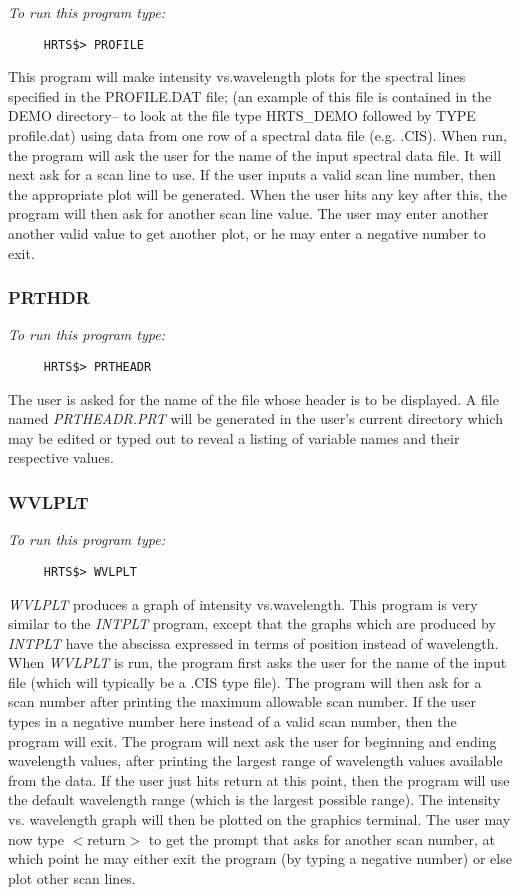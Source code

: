 {\em To run this program type:}
\begin{verbatim}                
     HRTS$> PROFILE               
\end{verbatim}
  This program will make intensity vs.wavelength plots for the
  spectral lines specified in the  PROFILE.DAT file; (an example of 
  this file is contained in the DEMO directory-- to look at the file type 
  HRTS\_DEMO followed by TYPE profile.dat)
  using data from one row of a spectral data file (e.g. .CIS).  When
  run, the program will ask the user for the name of the input spectral
  data file.  It will next ask for a scan line to use.  If the user
  inputs a valid scan line number, then the appropriate plot will be
  generated.  When the user hits any key after this, the program will
  then ask for another scan line value.  The user may enter another
  another valid value to get another plot, or he may enter a negative
  number to exit.

\subsubsection{PRTHDR}

{\em To run this program type:}
\begin{verbatim}                
     HRTS$> PRTHEADR                       
\end{verbatim}
  The user is asked for the name of the file whose header is to be
  displayed.  A file named {\em PRTHEADR.PRT} will be generated in the user's
  current directory which may be edited or typed out to reveal a listing
  of variable names and their respective values.

\subsubsection{WVLPLT}            

{\em To run this program type:}
\begin{verbatim}                
     HRTS$> WVLPLT                       
\end{verbatim}
{\em WVLPLT} produces a graph of intensity vs.wavelength.  This program
  is very similar to the {\em INTPLT} program, except that the graphs which are
  produced by {\em INTPLT} have the abscissa expressed in terms of position
  instead of wavelength.  When {\em WVLPLT} is run, the program first asks the
  user for the name of the input file (which will typically be a .CIS
  type file).   The program will then ask for a scan number after
  printing the maximum allowable scan number.  If the user types in a
  negative number here instead of a valid scan number, then the program
  will exit.  The program will next ask the user for beginning and ending
  wavelength values, after printing the largest range of wavelength
  values available from the data.  If the user just hits return at this
  point, then the program will use the default wavelength range (which is
  the largest possible range).  The intensity vs. wavelength graph will
  then be plotted on the graphics terminal.  The user may now type 
  $<$return$>$ to get the prompt that asks for another
  scan number, at which point he may either exit the program (by typing a
  negative number) or else plot other scan lines.

